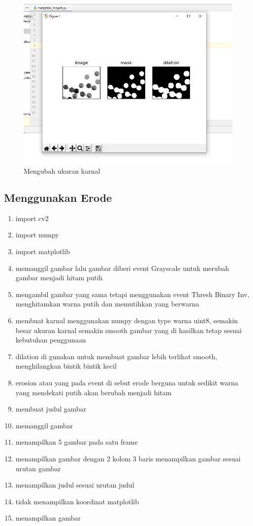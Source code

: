\begin{figure}[ht]
\centering
\includegraphics[scale=0.6]{figures/2,53.jpg}
\caption{Mengubah ukuran karnal}
\label{contoh}
\end{figure}







\newpage
\subsection{Menggunakan Erode}

\begin{enumerate}
	\item import cv2
	\item import numpy
	\item import matplotlib
	\item memanggil gambar lalu gambar diberi event Grayscale untuk merubah gambar menjadi hitam putih
	\item mengambil gambar yang sama tetapi menggunakan event Thresh Binary Inv, menghitamkan warna putih dan memutihkan yang berwarna
	\item membuat karnal menggunakan numpy dengan type warna uint8, semakin besar ukuran karnal semakin smooth gambar yang di hasilkan tetap sesuai kebutuhan penggunaan
	\item dilation di gunakan untuk membuat gambar lebih terlihat smooth, menghilangkan bintik bintik kecil
	\item erosion atau yang pada event di sebut erode berguna untuk sedikit warna yang mendekati putih akan berubah menjadi hitam
	\item membuat judul gambar
	\item memanggil gambar
	\item menampilkan 5 gambar pada satu frame
	\item menampilkan gambar dengan 2 kolom 3 baris menampilkan gambar sesuai urutan gambar
	\item menampilkan judul sesuai urutan judul
	\item tidak menampilkan koordinat matplotlib
	\item menampilkan gambar
\end{enumerate}

